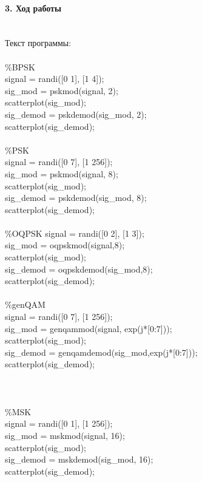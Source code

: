 \documentclass[12pt,a4paper]{report}
\begin{document}
\paragraph{3. Ход работы \\\\}
Текст программы:\\\\
\%BPSK\\
signal = randi([0 1], [1 4]);\\
sig\_mod = pskmod(signal, 2);\\
scatterplot(sig\_mod);\\
sig\_demod = pskdemod(sig\_mod, 2);\\
scatterplot(sig\_demod);\\\\
\%PSK\\
signal = randi([0 7], [1 256]);\\
sig\_mod = pskmod(signal, 8);\\
scatterplot(sig\_mod);\\
sig\_demod = pskdemod(sig\_mod, 8);\\
scatterplot(sig\_demod);\\\\
\%OQPSK
signal = randi([0 2], [1 3]);\\
sig\_mod = oqpskmod(signal,8);\\
scatterplot(sig\_mod);\\
sig\_demod = oqpskdemod(sig\_mod,8);\\
scatterplot(sig\_demod);\\\\
\%genQAM\\
signal = randi([0 7], [1 256]);\\
sig\_mod = genqammod(signal, exp(j*[0:7]));\\
scatterplot(sig\_mod);\\
sig\_demod = genqamdemod(sig\_mod,exp(j*[0:7]));\\
scatterplot(sig\_demod);\\\\\\\\
\%MSK\\
signal = randi([0 1], [1 256]);\\
sig\_mod = mskmod(signal, 16);\\
scatterplot(sig\_mod);\\
sig\_demod = mskdemod(sig\_mod, 16);\\
scatterplot(sig\_demod);\\
\end{document}
